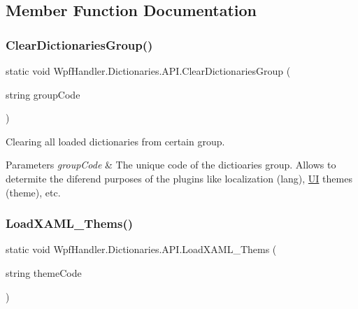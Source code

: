 \subsection{Member Function Documentation}
\mbox{\label{class_wpf_handler_1_1_dictionaries_1_1_a_p_i_a2611ee5407fe0a4cde1a2490a54d759e}} 
\subsubsection{\texorpdfstring{Clear\+Dictionaries\+Group()}{ClearDictionariesGroup()}}
{\footnotesize\ttfamily static void Wpf\+Handler.\+Dictionaries.\+A\+P\+I.\+Clear\+Dictionaries\+Group (\begin{DoxyParamCaption}\item[{string}]{group\+Code }\end{DoxyParamCaption})\hspace{0.3cm}{\ttfamily [static]}}



Clearing all loaded dictionaries from certain group. 


\begin{DoxyParams}{Parameters}
{\em group\+Code} & The unique code of the dictioaries group. Allows to determite the diferend purposes of the plugins like localization (lang), \mbox{\hyperlink{namespace_wpf_handler_1_1_u_i}{UI}} themes (theme), etc.\\
\hline
\end{DoxyParams}
\mbox{\label{class_wpf_handler_1_1_dictionaries_1_1_a_p_i_ac9aafbe351f06f0c20de39508d3e8852}} 
\subsubsection{\texorpdfstring{Load\+X\+A\+M\+L\+\_\+\+Thems()}{LoadXAML\_Thems()}}
{\footnotesize\ttfamily static void Wpf\+Handler.\+Dictionaries.\+A\+P\+I.\+Load\+X\+A\+M\+L\+\_\+\+Thems (\begin{DoxyParamCaption}\item[{string}]{theme\+Code }\end{DoxyParamCaption})\hspace{0.3cm}{\ttfamily [static]}}



